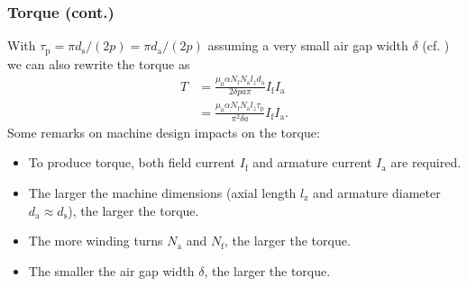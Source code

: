 \begin{frame}
	\frametitle{Torque (cont.)}
	With $\tau_\mathrm{p} = \pi d_\mathrm{s}/(2 p) = \pi d_\mathrm{a}/(2 p)$ assuming a very small air gap width $\delta$ (cf. ) we can also rewrite the torque as
	\begin{equation}
		\begin{split}
		T &= \frac{\mu_0 \alpha N_\mathrm{f} N_\mathrm{a} l_z d_\mathrm{a}}{2 \delta p a \pi} I_\mathrm{f} I_\mathrm{a}\\
		&= \frac{\mu_0 \alpha N_\mathrm{f} N_\mathrm{a} l_z \tau_\mathrm{p}}{\pi^2  \delta a} I_\mathrm{f} I_\mathrm{a}.
		\end{split}
		\label{eq:Torque_DC_machine}
	\end{equation}\pause
	Some remarks on machine design impacts on the torque:
	\begin{itemize}
		\item To produce torque, both field current $I_\mathrm{f}$ and armature current $I_\mathrm{a}$ are required. \pause
		\item The larger the machine dimensions (axial length $l_\mathrm{z}$ and armature diameter $d_\mathrm{a} \approx d_\mathrm{s}$), the larger the torque. \pause
		\item The more winding turns $N_\mathrm{a}$ and $N_\mathrm{f}$, the larger the torque. \pause
		\item The smaller the air gap width $\delta$, the larger the torque.
	\end{itemize}
\end{frame}

